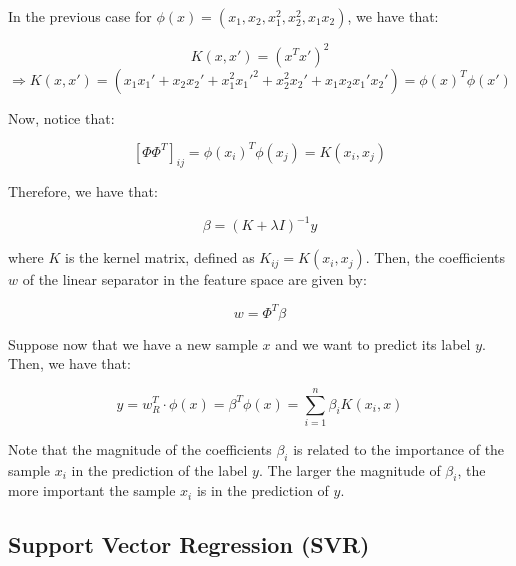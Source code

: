 In the previous case for $\phi(x) = (x_1, x_2, x_1^2, x_2^2, x_1 x_2)$, we have that:

$$K(x, x') = (x^T x')^2$$
$$\Rightarrow K(x, x') = (x_1 x_1' + x_2 x_2' + x_1^2 x_1'^2 + x_2^2 x_2' + x_1 x_2 x_1' x_2') = \phi(x)^T \phi(x')$$

Now, notice that: 

$$[\Phi \Phi^T]_{ij} = \phi(x_i)^T \phi(x_j) = K(x_i, x_j)$$ 

Therefore, we have that:

\begin{equation}
    \beta = (K + \lambda I)^{-1} y
\end{equation}

where $K$ is the kernel matrix, defined as $K_{ij} = K(x_i, x_j)$. Then, the coefficients $w$ of the linear separator
in the feature space are given by:

\begin{equation}
    w = \Phi^T \beta
\end{equation}

Suppose now that we have a new sample $x$ and we want to predict its label $y$. Then, we have that:

$$y = w_{R}^T \cdot \phi(x) = \beta^T \phi(x) = \sum_{i=1}^n \beta_i K(x_i, x)$$

Note that the magnitude of the coefficients $\beta_i$ is related to the importance of the sample $x_i$ in the prediction
of the label $y$. The larger the magnitude of $\beta_i$, the more important the sample $x_i$ is in the prediction of $y$.

\subsection{Support Vector Regression (SVR)}




